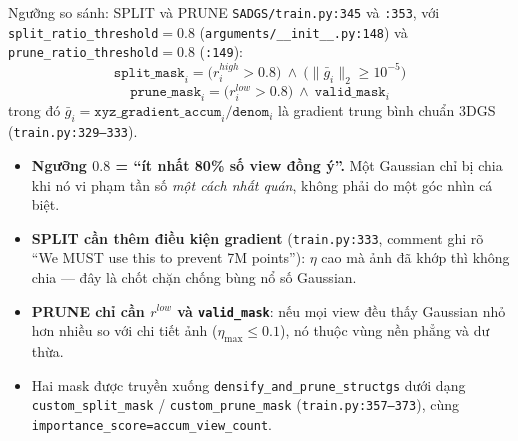 \begin{frame}[fragile]{Ngưỡng so sánh: SPLIT và PRUNE}
\footnotesize
\texttt{SADGS/train.py:345} và \texttt{:353}, với \texttt{split\_ratio\_threshold}$=0.8$ (\texttt{arguments/\_\_init\_\_.py:148}) và \texttt{prune\_ratio\_threshold}$=0.8$ (\texttt{:149}):
\[
\texttt{split\_mask}_i = \big(r^{high}_i > 0.8\big)\ \wedge\ \big(\|\bar{g}_i\|_2 \ge 10^{-5}\big)
\]
\[
\texttt{prune\_mask}_i = \big(r^{low}_i > 0.8\big)\ \wedge\ \texttt{valid\_mask}_i
\]
trong đó $\bar{g}_i=\texttt{xyz\_gradient\_accum}_i/\texttt{denom}_i$ là gradient trung bình chuẩn 3DGS (\texttt{train.py:329--333}).

\begin{itemize}\itemsep1pt
  \item \textbf{Ngưỡng $0.8$ = ``ít nhất 80\% số view đồng ý''.} Một Gaussian chỉ bị chia khi nó vi phạm tần số \emph{một cách nhất quán}, không phải do một góc nhìn cá biệt.
  \item \textbf{SPLIT cần thêm điều kiện gradient} (\texttt{train.py:333}, comment ghi rõ ``We MUST use this to prevent 7M points''): $\eta$ cao mà ảnh đã khớp thì không chia --- đây là chốt chặn chống bùng nổ số Gaussian.
  \item \textbf{PRUNE chỉ cần $r^{low}$ và \texttt{valid\_mask}}: nếu mọi view đều thấy Gaussian nhỏ hơn nhiều so với chi tiết ảnh ($\eta_{\max}\le 0.1$), nó thuộc vùng nền phẳng và dư thừa.
  \item Hai mask được truyền xuống \texttt{densify\_and\_prune\_structgs} dưới dạng \texttt{custom\_split\_mask} / \texttt{custom\_prune\_mask} (\texttt{train.py:357--373}), cùng \texttt{importance\_score=accum\_view\_count}.
\end{itemize}
\end{frame}


